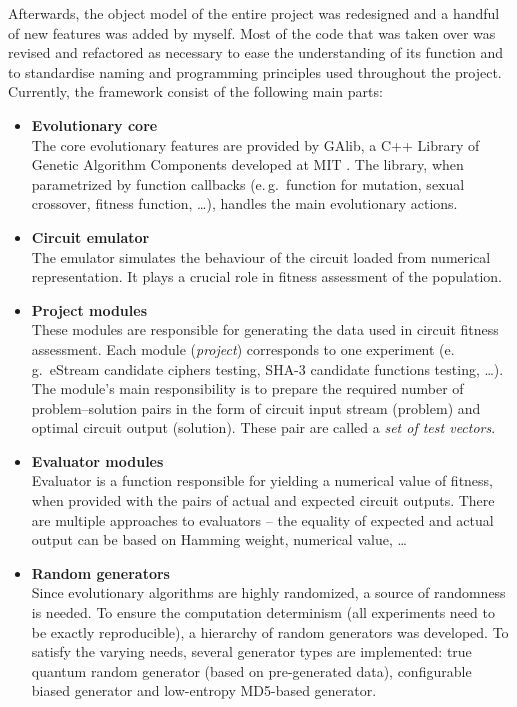 \documentclass[12pt,oneside]{fithesis2}
\begin{document}
Afterwards, the object model of the entire project was redesigned and a handful of new features was added by myself. 
Most of the code that was taken over was revised and refactored as necessary
to ease the understanding of its function and to standardise naming and programming principles used throughout the project. 
Currently, the framework consist of the following main parts:
\begin{itemize}
\item \textbf{Evolutionary core}\\
The core evolutionary features are provided by GAlib, a C++ Library of Genetic Algorithm Components developed at MIT \cite{galib}.
The library, when parametrized by function callbacks (e.\,g.\ function for mutation, sexual crossover, fitness function, \dots),
handles the main evolutionary actions.
\item \textbf{Circuit emulator}\\
The emulator simulates the behaviour of the circuit loaded from numerical representation. It plays a crucial role in
fitness assessment of the population.
\item \textbf{Project modules}\\
These modules are responsible for generating the data used in circuit fitness assessment. Each module (\textit{project}) corresponds
to one experiment (e.\,g.\ eStream candidate ciphers testing, SHA-3 candidate functions testing, \dots). The module's main
responsibility is to prepare the required number of problem--solution pairs in the form of circuit input stream (problem)
and optimal circuit output (solution). These pair are called a \textit{set of test vectors}.
\item \textbf{Evaluator modules}\\
Evaluator is a function responsible for yielding a numerical value of fitness, when provided with the pairs of
actual and expected circuit outputs. There are multiple approaches to evaluators -- the equality of expected and
actual output can be based on Hamming weight, numerical value, \dots
\item \textbf{Random generators}\\
Since evolutionary algorithms are highly randomized, a source of randomness is needed. To ensure the
computation determinism (all experiments need to be exactly reproducible), a hierarchy of random generators was developed.
To satisfy the varying needs, several generator types are implemented: true quantum random generator (based on pre-generated data),
configurable biased generator and low-entropy MD5-based generator.

\end{itemize}
\end{document}
